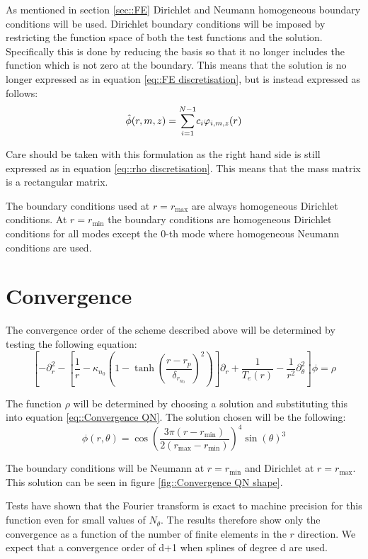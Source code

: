 As mentioned in section \ref{sec::FE} Dirichlet and Neumann homogeneous boundary conditions will be used. Dirichlet boundary conditions will be imposed by restricting the function space of both the test functions and the solution. Specifically this is done by reducing the basis so that it no longer includes the function which is not zero at the boundary. This means that the solution is no longer expressed as in equation \ref{eq::FE discretisation}, but is instead expressed as follows:
\begin{equation}
\hat{\phi}(r,m,z)=\underset{i=1}{\overset{N-1}{\sum}}c_i\varphi_{i,m,z}(r)
\end{equation}

Care should be taken with this formulation as the right hand side is still expressed as in equation \ref{eq::rho discretisation}. This means that the mass matrix is a rectangular matrix.

The boundary conditions used at $r=r_\text{max}$ are always homogeneous Dirichlet conditions. At $r=r_\text{min}$ the boundary conditions are homogeneous Dirichlet conditions for all modes except the 0-th mode where homogeneous Neumann conditions are used.

\section{Convergence}

The convergence order of the scheme described above will be determined by testing the following equation:
\begin{equation}\label{eq::Convergence QN}
 \left[-\partial_{r}^2 - \left[\frac{1}{r} - \kappa_{n_0} \left(1 - \tanh\left( \frac{r - r_p }{\delta_{r_{n_0}}}\right)^2\right)\right]\partial_r + \frac{1}{T_e(r)}-\frac{1}{r^2}\partial_\theta^2\right]\phi = \rho
\end{equation}

The function $\rho$ will be determined by choosing a solution and substituting this into equation \ref{eq::Convergence QN}. The solution chosen will be the following:
\begin{equation}\label{eq::Convergence QN solution}
 \phi(r,\theta)=\cos\left(\frac{3\pi(r-r_{\min})}{2(r_{\max}-r_{\min})}\right)^4\sin(\theta)^3
\end{equation}

The boundary conditions will be Neumann at $r=r_{\min}$ and Dirichlet at $r=r_{\max}$. This solution can be seen in figure \ref{fig::Convergence QN shape}.

Tests have shown that the Fourier transform is exact to machine precision for this function even for small values of $N_\theta$. The results therefore show only the convergence as a function of the number of finite elements in the $r$ direction. We expect that a convergence order of d+1 when splines of degree d are used.

